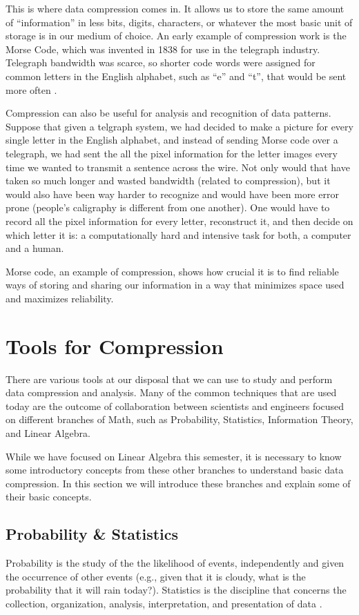 \documentclass[12pt]{report}
\begin{document}
        This is where data compression comes in. It allows us to store the same amount of ``information'' in less bits, digits, characters, or whatever the most basic unit of storage is in our medium of choice. An early example of compression work is the Morse Code, which was invented in 1838 for use in the telegraph industry. Telegraph bandwidth was scarce, so shorter code words were assigned for common letters in the English alphabet, such as ``e'' and ``t'', that would be sent more often \cite{Wolfram2002}.

        Compression can also be useful for analysis and recognition of data patterns. Suppose that given a telgraph system, we had decided to make a picture for every single letter in the English alphabet, and instead of sending Morse code over a telegraph, we had sent the all the pixel information for the letter images every time we wanted to transmit a sentence across the wire. Not only would that have taken so much longer and wasted bandwidth (related to compression), but it would also have been way harder to recognize and would have been more error prone (people's caligraphy is different from one another). One would have to record all the pixel information for every letter, reconstruct it, and then decide on which letter it is: a computationally hard and intensive task for both, a computer and a human.

        Morse code, an example of compression, shows how crucial it is to find reliable ways of storing and sharing our information in a way that minimizes space used and maximizes reliability.
    
    \chapter{Tools for Compression}
        There are various tools at our disposal that we can use to study and perform data compression and analysis. Many of the common techniques that are used today are the outcome of collaboration between scientists and engineers focused on different branches of Math, such as Probability, Statistics, Information Theory, and Linear Algebra.
        
        While we have focused on Linear Algebra this semester, it is necessary to know some introductory concepts from these other branches to understand basic data compression. In this section we will introduce these branches and explain some of their basic concepts.
        
        \section{Probability \& Statistics}
            Probability is the study of the the likelihood of events, independently and given the occurrence of other events (e.g., given that it is cloudy, what is the probability that it will rain today?). Statistics is the discipline that concerns the collection, organization, analysis, interpretation, and presentation of data \cite{wiki:Statistics}.
\end{document}
